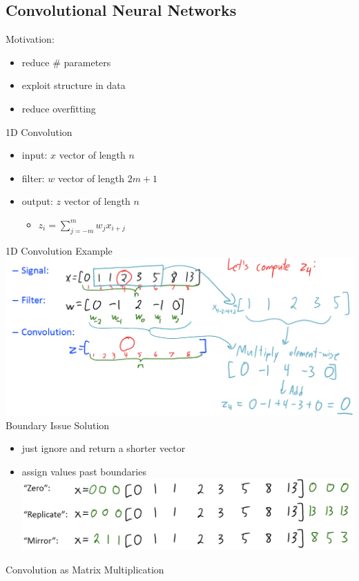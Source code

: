 \documentclass[10pt,landscape,a4paper]{article}
\begin{document}
\begin{multicols*}{5}
\subsection{Convolutional Neural Networks}
Motivation:
\begin{itemize}
    \item reduce \# parameters
    \item exploit structure in data
    \item reduce overfitting
\end{itemize}
1D Convolution
\begin{itemize}
    \item input: \(x\) vector of length \(n\)
    \item filter: \(w\) vector of length \(2m+1\)
    \item output: \(z\) vector of length \(n\)
    \begin{itemize}
        \item \(z_i = \sum\limits_{j=-m}^{m} w_j x_{i+j}\)
    \end{itemize}
\end{itemize}
1D Convolution Example \\
\includegraphics[scale=0.12]{1d_convolution_example}
Boundary Issue Solution
\begin{itemize}
    \item just ignore and return a shorter vector
    \item assign values past boundaries \\
    \includegraphics[scale=0.12]{past_boundaries}
\end{itemize}
Convolution as Matrix Multiplication \\

\end{multicols*}
\end{document}
